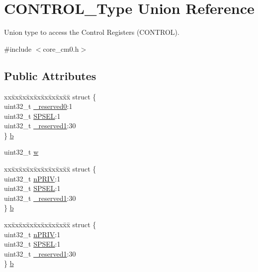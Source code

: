 \hypertarget{unionCONTROL__Type}{}\section{C\+O\+N\+T\+R\+O\+L\+\_\+\+Type Union Reference}
\label{unionCONTROL__Type}


Union type to access the Control Registers (C\+O\+N\+T\+R\+OL).  




{\ttfamily \#include $<$core\+\_\+cm0.\+h$>$}

\subsection*{Public Attributes}
\begin{DoxyCompactItemize}
\item 
\begin{tabbing}
xx\=xx\=xx\=xx\=xx\=xx\=xx\=xx\=xx\=\kill
struct \{\\
\>uint32\_t \hyperlink{unionCONTROL__Type_af8c314273a1e4970a5671bd7f8184f50}{\_reserved0}:1\\
\>uint32\_t \hyperlink{unionCONTROL__Type_a8cc085fea1c50a8bd9adea63931ee8e2}{SPSEL}:1\\
\>uint32\_t \hyperlink{unionCONTROL__Type_aa7a5662079a447f801034d108f80ce49}{\_reserved1}:30\\
\} \hyperlink{unionCONTROL__Type_ae3b4861e899b1f68818b60033a3914d9}{b}\\

\end{tabbing}\item 
uint32\+\_\+t \hyperlink{unionCONTROL__Type_a6b642cca3d96da660b1198c133ca2a1f}{w}
\item 
\begin{tabbing}
xx\=xx\=xx\=xx\=xx\=xx\=xx\=xx\=xx\=\kill
struct \{\\
\>uint32\_t \hyperlink{unionCONTROL__Type_a35c1732cf153b7b5c4bd321cf1de9605}{nPRIV}:1\\
\>uint32\_t \hyperlink{unionCONTROL__Type_a8cc085fea1c50a8bd9adea63931ee8e2}{SPSEL}:1\\
\>uint32\_t \hyperlink{unionCONTROL__Type_aa7a5662079a447f801034d108f80ce49}{\_reserved1}:30\\
\} \hyperlink{unionCONTROL__Type_afa110d4f7b263a9b5c34fb737ccb7fed}{b}\\

\end{tabbing}\item 
\begin{tabbing}
xx\=xx\=xx\=xx\=xx\=xx\=xx\=xx\=xx\=\kill
struct \{\\
\>uint32\_t \hyperlink{unionCONTROL__Type_a35c1732cf153b7b5c4bd321cf1de9605}{nPRIV}:1\\
\>uint32\_t \hyperlink{unionCONTROL__Type_a8cc085fea1c50a8bd9adea63931ee8e2}{SPSEL}:1\\
\>uint32\_t \hyperlink{unionCONTROL__Type_aa7a5662079a447f801034d108f80ce49}{\_reserved1}:30\\
\} \hyperlink{unionCONTROL__Type_a7579e944a74b155b0e5f1c17ac0309d7}{b}\\


\end{tabbing}
\end{DoxyCompactItemize}
